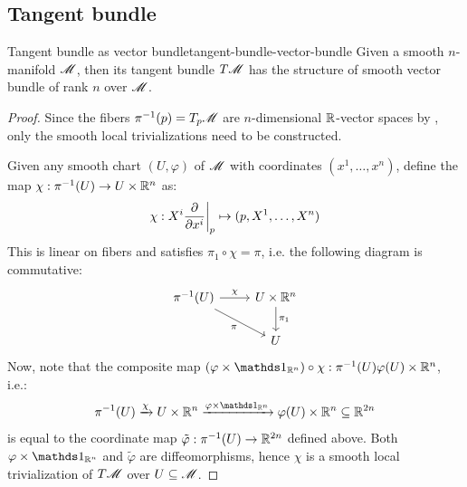 \subsection{Tangent bundle}
\label{ssec:tangent-bundle}

\begin{proposition}{Tangent bundle as vector bundle}{tangent-bundle-vector-bundle}
  Given a smooth $ n $-manifold $ \mathscr{M} $, then its tangent bundle $ T\mathscr{M} $ has the structure of smooth vector bundle of rank $ n $ over $ \mathscr{M} $.
\end{proposition}

\begin{proofbox}
  \begin{proof}
    Since the fibers $ \pi^{-1}(p) = T_p\mathscr{M} $ are $ n $-dimensional $ \mathbb{R} $-vector spaces by , only the smooth local trivializations need to be constructed.

    Given any smooth chart $ (U,\varphi) $ of $ \mathscr{M} $ with coordinates $ (x^1 , \dots , x^n) $, define the map $ \chi : \pi^{-1}(U) \rightarrow U \times \mathbb{R}^n $ as:
    \begin{equation*}
      \chi : X^i \frac{\partial}{\partial x^i} \bigg\vert_p \mapsto (p , X^1 , \dots , X^n)
    \end{equation*}
    This is linear on fibers and satisfies $ \pi_1 \circ \chi = \pi $, i.e. the following diagram is commutative:
    \begin{equation*}
      \begin{tikzcd}
        \pi^{-1}(U) \ar[r , "\chi"] \ar[dr, "\pi", swap] & U \times \R^n \ar[d , "\pi_1"] \\
        & U
      \end{tikzcd}
    \end{equation*}
    Now, note that the composite map $ (\varphi \times \id_{\R^n}) \circ \chi : \pi^{-1}(U) \varphi(U) \times \R^n $, i.e.:
    \begin{equation*}
      \pi^{-1}(U) \xrightarrow{\chi} U \times \R^n \xrightarrow{\varphi \times \id_{\R^n}} \varphi(U) \times \R^n \ssq \R^{2n}
    \end{equation*}
    is equal to the coordinate map $ \tilde{\varphi} : \pi^{-1}(U) \rightarrow \mathbb{R}^{2n} $ defined above. Both $ \varphi \times \id_{\R^n} $ and $ \tilde{\varphi} $ are diffeomorphisms, hence $ \chi $ is a smooth local trivialization of $ T\mathscr{M} $ over $ U \subseteq \mathscr{M} $.
  \end{proof}
\end{proofbox}

